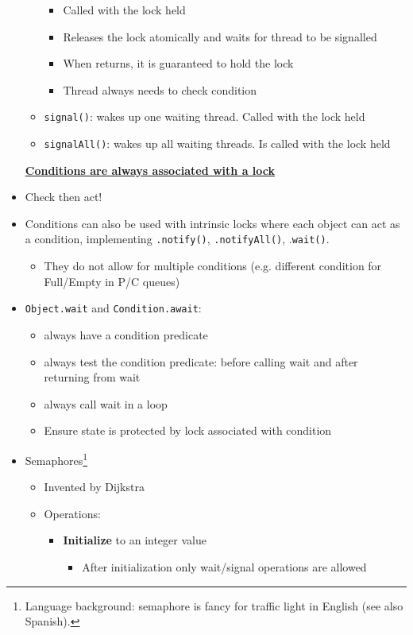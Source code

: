 \documentclass[a4paper]{article}
\newcommand{\inline}[1]{\lstinline!#1!}%
\begin{document}
\begin{itemize}
\begin{itemize}
\begin{itemize}
\item Called with the lock held
\item Releases the lock atomically and waits for thread to be signalled
\item When returns, it is guaranteed to hold the lock
\item Thread always needs to check condition
\end{itemize}
\item \inline{signal()}: wakes up one waiting thread. Called with the lock held
\item \inline{signalAll()}: wakes up all waiting threads. Is called with the lock held
\end{itemize}
\textbf{\underline{Conditions are always associated with a lock}}
\item Check then act! 
\item Conditions can also be used with intrinsic locks where each object can act as a condition, implementing \inline{.notify()}, \inline{.notifyAll()}, .\inline{wait()}. 
\begin{itemize}
\item They do not allow for multiple conditions (e.g. different condition for Full/Empty in P/C queues)
\end{itemize}
\item \inline{Object.wait} and \inline{Condition.await}: 
\begin{itemize}
\item always have a condition predicate
\item always test the condition predicate: before calling wait and after returning from wait 
\item always call wait in a loop
\item Ensure state is protected by lock associated with condition
\end{itemize}
\item Semaphores\footnote{Language background: semaphore is fancy for traffic light in English (see also Spanish).} 
\begin{itemize}
\item Invented by Dijkstra
\item Operations:
\begin{itemize}
\item \textbf{Initialize} to an integer value
\begin{itemize}
\item After initialization only wait/signal operations are allowed

\end{itemize}
\end{itemize}
\end{itemize}
\end{itemize}
\end{document}
